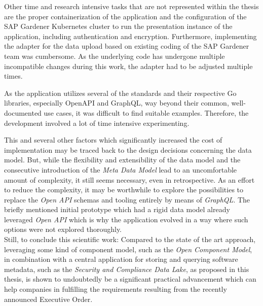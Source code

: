 Other time and research intensive tasks that are not represented within the thesis are the proper containerization of the application and the configuration of the SAP Gardener Kubernetes cluster to run the presentation instance of the application, including authentication and encryption. Furthermore, implementing the adapter for the data upload based on existing coding of the SAP Gardener team was cumbersome. As the underlying code has undergone multiple incompatible changes during this work, the adapter had to be adjusted multiple times.\par
As the application utilizes several of the standards and their respective Go libraries, especially OpenAPI and GraphQL, way beyond their common, well-documented use cases, it was difficult to find suitable examples. Therefore, the development involved a lot of time intensive experimenting.\par
This and several other factors which significantly increased the cost of implementation may be traced back to the design decisions concerning the data model.  But, while the flexibility and extensibility of the data model and the consecutive introduction of the \emph{Meta Data Model} lead to an uncomfortable amount of complexity, it still seems necessary, even in retrospective. As an effort to reduce the complexity, it may be worthwhile to explore the possibilities to replace the \emph{Open API} schemas and tooling entirely by means of \emph{GraphQL}. The briefly mentioned initial prototype which had a rigid data model already leveraged \emph{Open API} which is why the application evolved in a way where such options were not explored thoroughly.\\

Still, to conclude this scientific work: Compared to the state of the art approach, leveraging some kind of component model, such as the \emph{Open Component Model}, in combination with a central application for storing and querying software metadata, such as the \emph{Security and Compliance Data Lake}, as proposed in this thesis, is shown to undoubtedly be a significant practical advancement which can help companies in fulfilling the requirements resulting from the recently announced Executive Order. 

